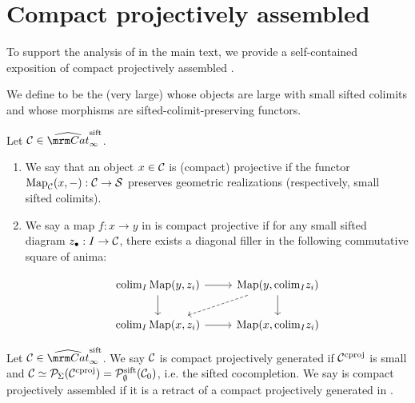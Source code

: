 \documentclass[a4paper,10pt, oneside]{amsart}
\begin{document}
\section{Compact projectively assembled \infcats}\label{appendixB}
To support the analysis of \dualaddinfcats in the main text, we provide a self-contained exposition of compact projectively assembled \infcats. %
	\begin{de}
	We define \catsift to be the (very large) \infcat whose objects are large \infcats with small sifted colimits and whose morphisms are sifted-colimit-preserving functors. 
	\end{de}
		\begin{de}
		Let $\mcc\in\catsift$. 
		\begin{enumerate}[label=(\arabic*),font=\normalfont]
			\item We say that an object $x\in \mathcal{C}$ is (compact) projective if the functor $\operatorname{Map}_{\mathcal{C}}(x,-):\mathcal{C}\to\mathcal{S}$ preserves geometric realizations (respectively, small sifted colimits).
			\item We say a map $f:x\to y$ in \mcc is compact projective if    for any small sifted diagram
			$z_\bullet : I \to \mathcal{C}$, there exists a diagonal filler in the following commutative square of anima:  
			
			$$%
			\begin{tikzcd}
				{\colimit_{I}\mapp(y,z_i)} \arrow[d] \arrow[r] & {\mapp(y,\colimit_{I}z_i)} \arrow[d] \arrow[ld, dashed] \\
				{\colimit_{I}\mapp(x,z_i)} \arrow[r]           & {\mapp(x,\colimit_{I}z_i)}                             
			\end{tikzcd}$$
		\end{enumerate}
	\end{de}
	\begin{de}
		Let $\mcc\in \catsift$. We say $\mathcal{C}$ is compact projectively generated if $\mathcal{C}^{\mathrm{cproj}}$ is small and $\mathcal{C}\simeq \mathcal{P}_{\Sigma}(\mathcal{C}^{\mathrm{cproj}})=\mathcal{P}_{\emptyset}^{\mathrm{sift}}(\mathcal{C}_0)$, i.e.  the sifted cocompletion. We say \mcc is compact projectively assembled if it is a retract of a compact projectively generated \infcat in \catsift.
	\end{de}
\end{document}
